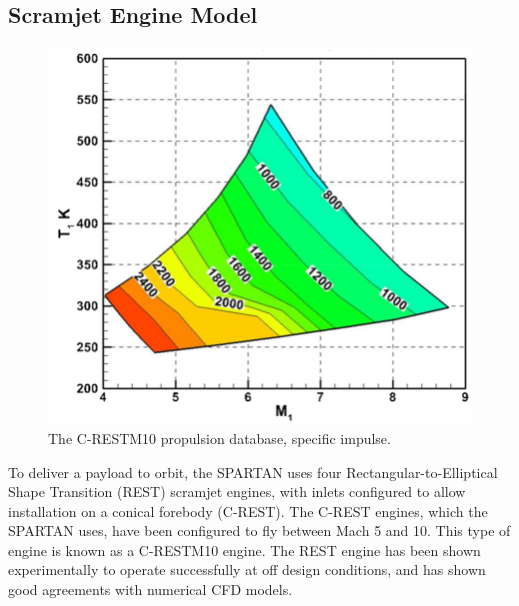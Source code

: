 \subsection{Scramjet Engine Model}\label{sec:enginemodel}
\begin{figure}
	\centering
	\includegraphics[width=0.7\linewidth]{figures/2_literature-review/C-REST}
	\caption{The C-RESTM10 propulsion database, specific impulse.}
	\label{fig:C-REST}
\end{figure}
To deliver a payload to orbit, the SPARTAN uses four Rectangular-to-Elliptical Shape Transition (REST) scramjet engines, with inlets configured to allow installation on a conical forebody (C-REST). The C-REST engines, which the SPARTAN uses, have been configured to fly between Mach 5 and 10. This type of engine is known as a C-RESTM10 engine\cite{Preller2017b}. The REST engine has been shown experimentally to operate successfully at off design conditions\cite{Smart2006,Smart2009a}, and has shown good agreements with numerical CFD models\cite{Smart2009a}. 

